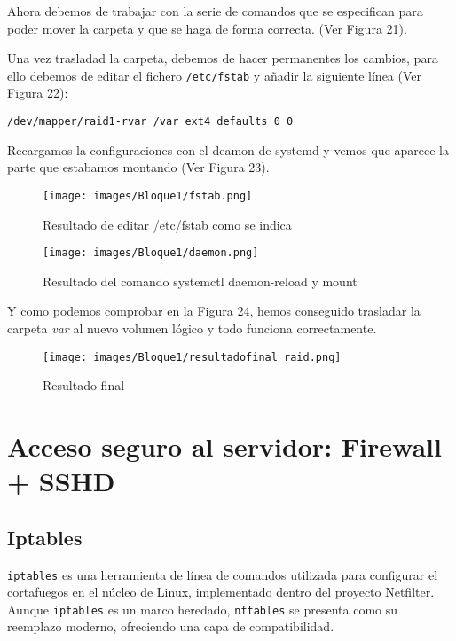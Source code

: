 Ahora debemos de trabajar con la serie de comandos que se especifican para poder mover la carpeta y que se haga de forma correcta. (Ver Figura 21).

Una vez trasladad la carpeta, debemos de hacer permanentes los cambios, para ello debemos de editar el fichero \texttt{/etc/fstab} y añadir la siguiente línea (Ver Figura 22):

\begin{lstlisting}[style=mystyle]
  /dev/mapper/raid1-rvar /var ext4 defaults 0 0
\end{lstlisting}

Recargamos la configuraciones con el deamon de systemd y vemos que aparece la parte que estabamos montando (Ver Figura 23).

\begin{figure}[htbp]
  \centering
  \begin{minipage}[b]{0.45\textwidth}
      \centering
      \texttt{[image: images/Bloque1/fstab.png]}
      \caption{Resultado de editar /etc/fstab como se indica}
  \end{minipage}
  \hfill
  \begin{minipage}[b]{0.45\textwidth}
      \centering
      \texttt{[image: images/Bloque1/daemon.png]}
      \caption{Resultado del comando systemctl daemon-reload y mount}
  \end{minipage}
\end{figure}

Y como podemos comprobar en la Figura 24, hemos conseguido trasladar la carpeta \textit{var} al nuevo volumen lógico y todo funciona correctamente.

\begin{figure}[H]
  \centering
  \texttt{[image: images/Bloque1/resultadofinal\_raid.png]}
  \caption{Resultado final}
\end{figure}

\newpage
\section{Acceso seguro al servidor: Firewall + SSHD}

\subsection{Iptables}

\texttt{iptables} es una herramienta de línea de comandos utilizada para configurar el cortafuegos en el núcleo de Linux, implementado dentro del proyecto Netfilter. Aunque \texttt{iptables} es un marco heredado, \texttt{nftables} se presenta como su reemplazo moderno, ofreciendo una capa de compatibilidad. 

